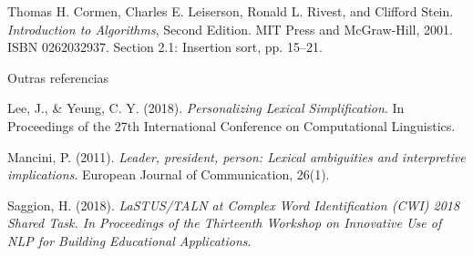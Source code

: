 \documentclass{article}
\begin{document}
Thomas H. Cormen, Charles E. Leiserson, Ronald L. Rivest, and Clifford Stein. \textit{Introduction to Algorithms}, Second Edition. MIT Press and McGraw-Hill, 2001. ISBN 0262032937. Section 2.1: Insertion sort, pp. 15–21.

Outras referencias

Lee, J., & Yeung, C. Y. (2018). \textit{Personalizing Lexical Simplification}. In Proceedings of the 27th International Conference on Computational Linguistics.

Mancini, P. (2011). \textit{Leader, president, person: Lexical ambiguities and interpretive implications}. European Journal of Communication, 26(1).

Saggion, H. (2018). \textit{LaSTUS/TALN at Complex Word Identification (CWI) 2018 Shared Task. In Proceedings of the Thirteenth Workshop on Innovative Use of NLP for Building Educational Applications}.
\end{document}
